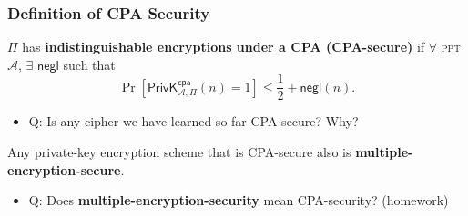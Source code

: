 \begin{frame}\frametitle{Definition of CPA Security}
\begin{definition}\label{def:cap-ind}
$\Pi$ has \textbf{indistinguishable encryptions under a CPA (CPA-secure)} if $\forall$ \textsc{ppt} $\mathcal{A}$, $\exists$ $\mathsf{negl}$ such that
\[ \Pr\left[\mathsf{PrivK}^{\mathsf{cpa}}_{\mathcal{A},\Pi}(n)=1\right] \le \frac{1}{2} + \mathsf{negl}(n).
\]
\end{definition}
\begin{itemize}
\item \alert{Q: Is any cipher we have learned so far CPA-secure? Why?}
\end{itemize}
\begin{proposition}
Any private-key encryption scheme that is CPA-secure also is \textbf{multiple-encryption-secure}.
\end{proposition}
\begin{itemize}
\item \alert{Q: Does \textbf{multiple-encryption-security} mean CPA-security?} (homework)
\end{itemize}
\end{frame}
